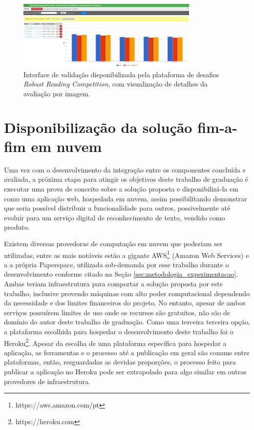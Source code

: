 \begin{figure}
    \centering
    \includegraphics[width=0.8\textwidth]{figs/metodologia-interface-validacao.png}
    \caption{Interface de validação disponibilizada pela plataforma de desafios \textit{Robust Reading Competition}, com visualização de detalhes da avaliação por imagem.}
    \label{fig:methodology_validation_interface_details}
\end{figure}

\section{Disponibilização da solução fim-a-fim em nuvem}\label{sec:methodology_cloud_deploy}
Uma vez com o desenvolvimento da integração entre os componentes concluída e avaliada, a próxima etapa para atingir os objetivos deste trabalho de graduação é executar uma prova de conceito sobre a solução proposta e disponibilizá-la em como uma aplicação web, hospedada em nuvem, assim possibilitando demonstrar que seria possível distribuir a funcionalidade para outros, possivelmente até evoluir para um serviço digital de reconhecimento de texto, vendido como produto.

Existem diversas provedoras de computação em nuvem que poderiam ser utilizadas, entre as mais notáveis estão a gigante AWS\footnote{https://aws.amazon.com/pt} (Amazon Web Services) e a a própria Paperspace, utilizada sob-demanda por esse trabalho durante o desenvolvimento conforme citado na Seção \ref{sec:metodologia_experimentacao}. Ambas teriam infraestrutura para comportar a solução proposta por este trabalho, inclusive provendo máquinas com alto poder computacional dependendo da necessidade e dos limites financeiros do projeto. No entanto, apesar de ambos serviços possuírem limites de uso onde os recursos são gratuitos, não são de domínio do autor deste trabalho de graduação. Como uma terceira terceira opção, a plataforma escolhida para hospedar o desenvolvimento deste trabalho foi o Heroku\footnote{https://heroku.com}. Apesar da escolha de uma plataforma específica para hospedar a aplicação, as ferramentas e o processo até a publicação em geral são comuns entre plataformas, então, resguardadas as devidas proporções, o processo feito para publicar a aplicação no Heroku pode ser extrapolado para algo similar em outras provedores de infraestrutura.

